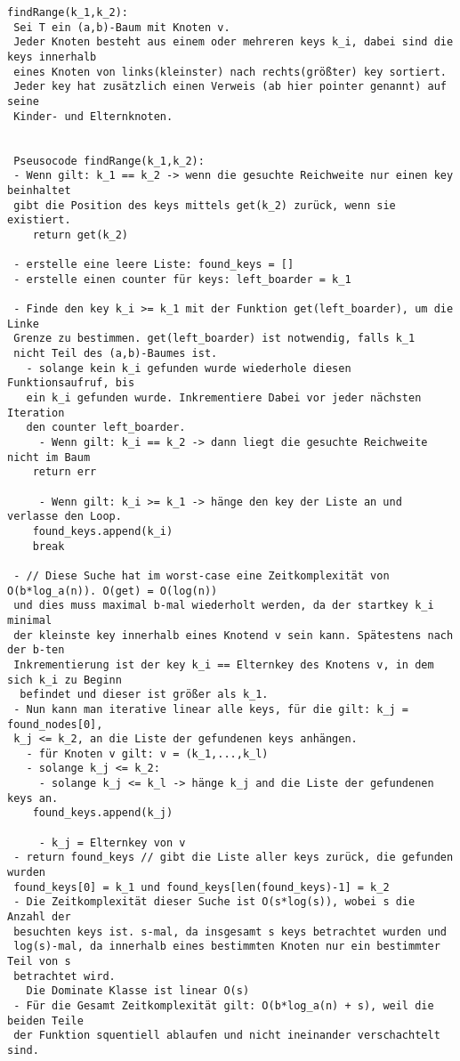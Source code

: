 \begin{verbatim}
findRange(k_1,k_2):
 Sei T ein (a,b)-Baum mit Knoten v.
 Jeder Knoten besteht aus einem oder mehreren keys k_i, dabei sind die keys innerhalb 
 eines Knoten von links(kleinster) nach rechts(größter) key sortiert.
 Jeder key hat zusätzlich einen Verweis (ab hier pointer genannt) auf seine 
 Kinder- und Elternknoten.
 
 
 Pseusocode findRange(k_1,k_2):
 - Wenn gilt: k_1 == k_2 -> wenn die gesuchte Reichweite nur einen key beinhaltet 
 gibt die Position des keys mittels get(k_2) zurück, wenn sie existiert.
	return get(k_2)
	
 - erstelle eine leere Liste: found_keys = []
 - erstelle einen counter für keys: left_boarder = k_1
 
 - Finde den key k_i >= k_1 mit der Funktion get(left_boarder), um die Linke 
 Grenze zu bestimmen. get(left_boarder) ist notwendig, falls k_1 
 nicht Teil des (a,b)-Baumes ist.
   - solange kein k_i gefunden wurde wiederhole diesen Funktionsaufruf, bis 
   ein k_i gefunden wurde. Inkrementiere Dabei vor jeder nächsten Iteration 
   den counter left_boarder.
     - Wenn gilt: k_i == k_2 -> dann liegt die gesuchte Reichweite nicht im Baum
	return err
	
     - Wenn gilt: k_i >= k_1 -> hänge den key der Liste an und verlasse den Loop.
	found_keys.append(k_i)
	break
	
 - // Diese Suche hat im worst-case eine Zeitkomplexität von O(b*log_a(n)). O(get) = O(log(n)) 
 und dies muss maximal b-mal wiederholt werden, da der startkey k_i minimal 
 der kleinste key innerhalb eines Knotend v sein kann. Spätestens nach der b-ten
 Inkrementierung ist der key k_i == Elternkey des Knotens v, in dem sich k_i zu Beginn
  befindet und dieser ist größer als k_1.
 - Nun kann man iterative linear alle keys, für die gilt: k_j = found_nodes[0], 
 k_j <= k_2, an die Liste der gefundenen keys anhängen.
   - für Knoten v gilt: v = (k_1,...,k_l)
   - solange k_j <= k_2:
     - solange k_j <= k_l -> hänge k_j and die Liste der gefundenen keys an.
	found_keys.append(k_j) 
	
     - k_j = Elternkey von v
 - return found_keys // gibt die Liste aller keys zurück, die gefunden wurden 
 found_keys[0] = k_1 und found_keys[len(found_keys)-1] = k_2
 - Die Zeitkomplexität dieser Suche ist O(s*log(s)), wobei s die Anzahl der 
 besuchten keys ist. s-mal, da insgesamt s keys betrachtet wurden und 
 log(s)-mal, da innerhalb eines bestimmten Knoten nur ein bestimmter Teil von s 
 betrachtet wird.
   Die Dominate Klasse ist linear O(s)
 - Für die Gesamt Zeitkomplexität gilt: O(b*log_a(n) + s), weil die beiden Teile 
 der Funktion squentiell ablaufen und nicht ineinander verschachtelt sind. 
\end{verbatim}

